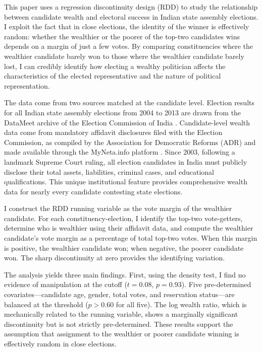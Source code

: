 \documentclass[12pt]{article}
\begin{document}
This paper uses a regression discontinuity design (RDD) to study the relationship between candidate wealth and electoral success in Indian state assembly elections. I exploit the fact that in close elections, the identity of the winner is effectively random: whether the wealthier or the poorer of the top-two candidates wins depends on a margin of just a few votes. By comparing constituencies where the wealthier candidate barely won to those where the wealthier candidate barely lost, I can credibly identify how electing a wealthy politician affects the characteristics of the elected representative and the nature of political representation.

The data come from two sources matched at the candidate level. Election results for all Indian state assembly elections from 2004 to 2013 are drawn from the DataMeet archive of the Election Commission of India \citep{datameet2020}. Candidate-level wealth data come from mandatory affidavit disclosures filed with the Election Commission, as compiled by the Association for Democratic Reforms (ADR) and made available through the MyNeta.info platform \citep{adr2023}. Since 2003, following a landmark Supreme Court ruling, all election candidates in India must publicly disclose their total assets, liabilities, criminal cases, and educational qualifications. This unique institutional feature provides comprehensive wealth data for nearly every candidate contesting state elections.

I construct the RDD running variable as the vote margin of the wealthier candidate. For each constituency-election, I identify the top-two vote-getters, determine who is wealthier using their affidavit data, and compute the wealthier candidate's vote margin as a percentage of total top-two votes. When this margin is positive, the wealthier candidate won; when negative, the poorer candidate won. The sharp discontinuity at zero provides the identifying variation.

The analysis yields three main findings. First, using the \citet{mccrary2008manipulation} density test, I find no evidence of manipulation at the cutoff ($t = 0.08$, $p = 0.93$). Five pre-determined covariates---candidate age, gender, total votes, and reservation status---are balanced at the threshold ($p > 0.60$ for all five). The log wealth ratio, which is mechanically related to the running variable, shows a marginally significant discontinuity but is not strictly pre-determined. These results support the assumption that assignment to the wealthier or poorer candidate winning is effectively random in close elections.
\end{document}
